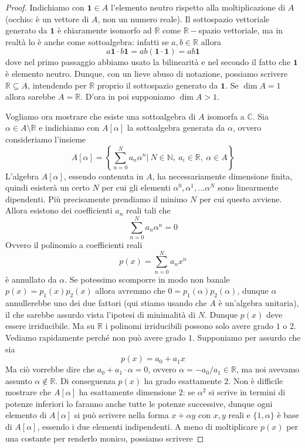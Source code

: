 \documentclass[11pt]{article}
\theoremstyle{plain}
\theoremstyle{definition}
\theoremstyle{remark}
\newcommand{\C}{\mathbb{C}}
\newcommand{\R}{\mathbb{R}}
\newcommand{\dsum}{\displaystyle\sum}
\begin{document}
\begin{proof}
Indichiamo con $\bm{1}\in A$ l'elemento neutro rispetto alla moltiplicazione di $A$ (occhio: è un vettore di $A$, non un numero reale).
Il sottospazio vettoriale generato da $\bm{1}$ è chiaramente isomorfo ad $\R$ come $\R-$spazio vettoriale, ma in
realtà lo è anche come sottoalgebra: infatti se $a,b\in\R$ allora
\[a\bm{1} \cdot b\bm{1} = ab (\bm{1}\cdot \bm{1}) = ab\bm{1} \]
dove nel primo passaggio abbiamo usato la bilinearità e nel secondo il fatto che $\bm{1}$ è elemento neutro.
Dunque, con un lieve abuso di notazione, possiamo scrivere $\R \subseteq A$, intendendo per $\R$ proprio il sottospazio generato da $\bm{1}$.
Se $\dim A = 1$ allora sarebbe $A=\R$. D'ora in poi supponiamo $\dim A > 1$.

Vogliamo ora mostrare che esiste una sottoalgebra di $A$ isomorfa a $\C$.
Sia $\alpha\in A \setminus\R$ e indichiamo con $A[\alpha]$ la sottoalgebra generata da $\alpha$, ovvero consideriamo l'insieme
\[A[\alpha] = \left\{ \dsum_{n = 0} ^N a_n \alpha^n |\ N\in\mathbb{N}, \ a_i \in \R,\ \alpha \in A   \right\} \]
L'algebra $A[\alpha]$, essendo contenuta in $A$, ha necessariamente dimensione finita, quindi esisterà un certo $N$ per cui gli elementi
$\alpha^0, \alpha^1, \dots \alpha^N$ sono linearmente dipendenti. Più precisamente prendiamo il minimo $N$ per cui questo avviene.
Allora esistono dei coefficienti $a_n$ reali tali che
\[ \dsum_{n=0}^N a_n \alpha^n = 0 \]
Ovvero il polinomio a coefficienti reali
\[ p(x) = \dsum_{n = 0}^N a_n x^n \]
è annullato da $\alpha$.
Se potessimo scomporre in modo non banale $p(x) = p_1(x)p_2(x)$ allora avremmo che $0 = p_1(\alpha)p_2(\alpha)$, dunque $\alpha$ annullerebbe uno dei due fattori (qui
stiamo usando che $A$ è un'algebra unitaria), il che sarebbe assurdo vista l'ipotesi di minimalità di $N$.
Dunque $p(x)$ deve essere irriducibile. Ma su $\R$ i polinomi irriducibili possono solo avere grado $1$ o $2$.
Vediamo rapidamente perché non può avere grado $1$.
Supponiamo per assurdo che sia
\[p(x) = a_0 + a_1 x\]
Ma ciò vorrebbe dire che $a_0+a_1\cdot\alpha=0$, ovvero $\alpha=-a_0/a_1 \in \R$, ma noi avevamo assunto $\alpha\not\in\R$.
Di conseguenza $p(x)$ ha grado esattamente $2$.
Non è difficile mostrare che $A[\alpha]$ ha esattamente dimensione $2$: se $\alpha^2$ si scrive in termini di potenze inferiori lo faranno anche tutte le potenze successive,
dunque ogni elemento di $A[\alpha]$ si può scrivere nella forma $x + \alpha y$ con $x,y$ reali e $\{1,\alpha\}$ è base di $A[\alpha]$, essendo i due elementi indipendenti.
A meno di moltiplicare $p(x)$ per una costante per renderlo monico, possiamo scrivere

\end{proof}
\end{document}
